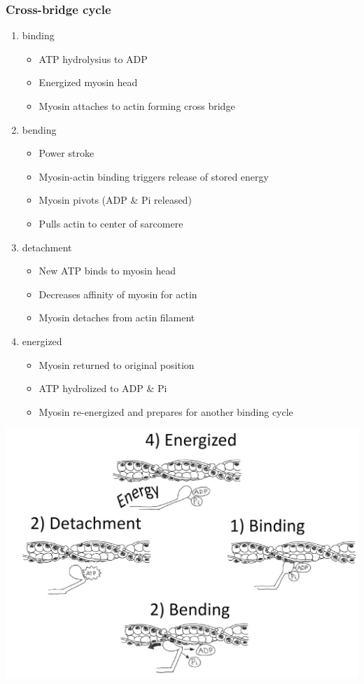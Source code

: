 \documentclass[11pt,fleqn]{book} %
\begin{document}
\subsubsection{Cross-bridge cycle}
\begin{enumerate}
    \item binding
    \begin{itemize}
        \item ATP hydrolysius to ADP
        \item Energized myosin head
        \item Myosin attaches to actin forming cross bridge
    \end{itemize}
    \item bending
    \begin{itemize}
        \item Power stroke
        \item Myosin-actin binding triggers release of stored energy
        \item Myosin pivots (ADP \& Pi released)
        \item Pulls actin to center of sarcomere
    \end{itemize}
    \item detachment
    \begin{itemize}
        \item New ATP binds to myosin
head
        \item Decreases affinity of myosin
for actin
        \item Myosin detaches from actin
filament
    \end{itemize}
    \item energized
    \begin{itemize}
        \item Myosin returned to original
position
        \item ATP hydrolized to ADP \& Pi
        \item Myosin re-energized and
prepares for another binding
cycle
    \end{itemize}
\end{enumerate}
\begin{center}
    \includegraphics[width=0.65\linewidth]{Pictures/Screenshot 2024-04-03 223633.png}
\end{center}
\end{document}
